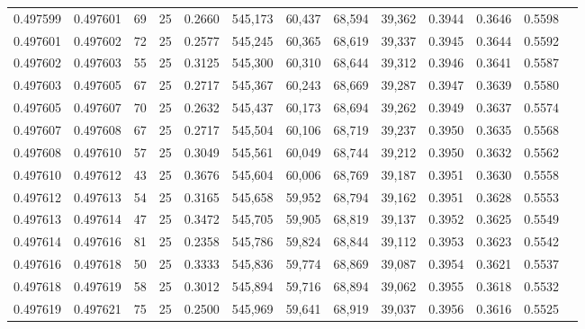 \begin{tabular}{rrrrrrrrrrrrr}
0.497599 & 0.497601 &    69 &  25 &                                     0.2660 & 545,173 &  60,437 &  68,594 &  39,362 & 0.3944 & 0.3646 & 0.5598 \\
0.497601 & 0.497602 &    72 &  25 &                                     0.2577 & 545,245 &  60,365 &  68,619 &  39,337 & 0.3945 & 0.3644 & 0.5592 \\
0.497602 & 0.497603 &    55 &  25 &                                     0.3125 & 545,300 &  60,310 &  68,644 &  39,312 & 0.3946 & 0.3641 & 0.5587 \\
0.497603 & 0.497605 &    67 &  25 &                                     0.2717 & 545,367 &  60,243 &  68,669 &  39,287 & 0.3947 & 0.3639 & 0.5580 \\
0.497605 & 0.497607 &    70 &  25 &                                     0.2632 & 545,437 &  60,173 &  68,694 &  39,262 & 0.3949 & 0.3637 & 0.5574 \\
0.497607 & 0.497608 &    67 &  25 &                                     0.2717 & 545,504 &  60,106 &  68,719 &  39,237 & 0.3950 & 0.3635 & 0.5568 \\
0.497608 & 0.497610 &    57 &  25 &                                     0.3049 & 545,561 &  60,049 &  68,744 &  39,212 & 0.3950 & 0.3632 & 0.5562 \\
0.497610 & 0.497612 &    43 &  25 &                                     0.3676 & 545,604 &  60,006 &  68,769 &  39,187 & 0.3951 & 0.3630 & 0.5558 \\
0.497612 & 0.497613 &    54 &  25 &                                     0.3165 & 545,658 &  59,952 &  68,794 &  39,162 & 0.3951 & 0.3628 & 0.5553 \\
0.497613 & 0.497614 &    47 &  25 &                                     0.3472 & 545,705 &  59,905 &  68,819 &  39,137 & 0.3952 & 0.3625 & 0.5549 \\
0.497614 & 0.497616 &    81 &  25 &                                     0.2358 & 545,786 &  59,824 &  68,844 &  39,112 & 0.3953 & 0.3623 & 0.5542 \\
0.497616 & 0.497618 &    50 &  25 &                                     0.3333 & 545,836 &  59,774 &  68,869 &  39,087 & 0.3954 & 0.3621 & 0.5537 \\
0.497618 & 0.497619 &    58 &  25 &                                     0.3012 & 545,894 &  59,716 &  68,894 &  39,062 & 0.3955 & 0.3618 & 0.5532 \\
0.497619 & 0.497621 &    75 &  25 &                                     0.2500 & 545,969 &  59,641 &  68,919 &  39,037 & 0.3956 & 0.3616 & 0.5525 \\

\end{tabular}
